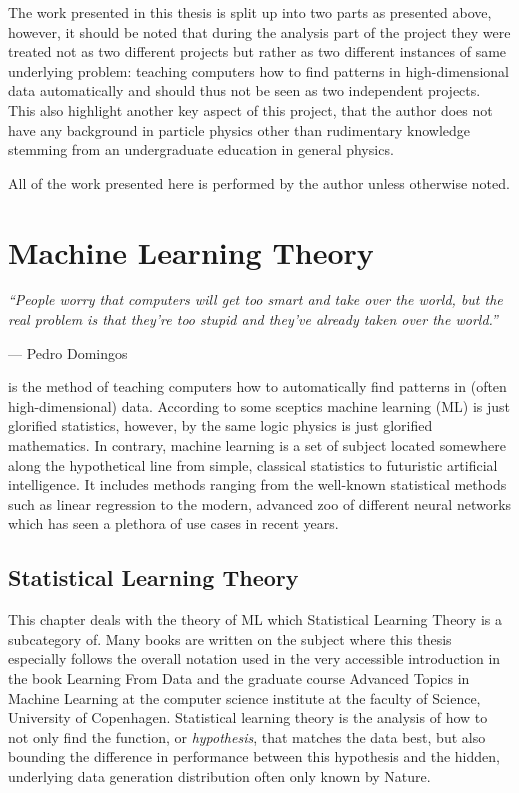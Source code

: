 \documentclass[a4paper, twoside, nobib]{tufte-book}
\begin{document}
The work presented in this thesis is split up into two parts as presented above, however, it should be noted that during the analysis part of the project they were treated not as two different projects but rather as two different instances of same underlying problem: teaching computers how to find patterns in high-dimensional data automatically and should thus not be seen as two independent projects. This also highlight another key aspect of this project, that the author does not have any background in particle physics other than rudimentary knowledge stemming from an undergraduate education in general physics. 

All of the work presented here is performed by the author unless otherwise noted.

\chapter{Machine Learning Theory}
\label{ch:ML_theory}

\epigraph{\textit{``People worry that computers will get too smart and take over the world, but the real problem is that they're too stupid and they've already taken over the world.''}}{--- Pedro Domingos}

 is the method of teaching computers how to automatically find patterns in (often high-dimensional) data. According to some sceptics machine learning (ML) is just glorified statistics, however, by the same logic physics is just glorified mathematics. In contrary, machine learning is a set of subject located somewhere along the hypothetical line from simple, classical statistics to futuristic artificial intelligence. It includes methods ranging from the well-known statistical methods such as linear regression to the modern, advanced zoo of different neural networks \citep{veenNeuralNetworkZoo2016} which has seen a plethora of use cases in recent years. 

\section{Statistical Learning Theory}
This chapter deals with the theory of ML which Statistical Learning Theory is a subcategory of. Many books are written on the subject where this thesis especially follows the overall notation used in the very accessible introduction in the book Learning From Data \citep{abu-mostafaLearningData2012} and the graduate course Advanced Topics in Machine Learning \citep{AdvancedTopicsMachine} at the computer science institute at the faculty of Science, University of Copenhagen. Statistical learning theory is the analysis of how to not only find the function, or \emph{hypothesis}, that matches the data best, but also bounding the difference in performance between this hypothesis and the hidden, underlying data generation distribution often only known by Nature. 
\end{document}
